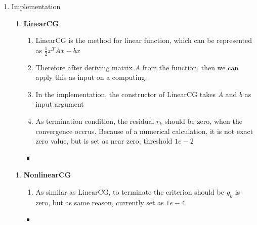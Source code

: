 \documentclass{standalone}
\begin{document}
\begin{enumerate}
  \item Implementation
  \begin{enumerate}
    \item \textbf{LinearCG}
    \begin{enumerate}
      \item LinearCG is the method for linear function, which can be represented as $\frac{1}{2}x^TAx -bx$
      \item Therefore after deriving matrix $A$ from the function, then we can apply this as input on a computing.
      \item In the implementation, the constructor of LinearCG takes $A$ and $b$ as input argument
      \item As termination condition, the residual $r_k$ should be zero, when the convergence occrus. 
      Because of a numerical calculation, it is not exact zero value, but is set as near zero, threshold $1e-2$
    \end{enumerate}
    
    \begin{itemize}[label=\quad,leftmargin=-5em]
      \item {}
    \end{itemize}
    \end{enumerate}

  \newpage \begin{enumerate}
    \item \textbf{NonlinearCG}
    \begin{enumerate}
      \item As similar as LinearCG, to terminate the criterion should be $g_k$ is zero, but as same reason, currently set as $1e-4$
    \end{enumerate}
    
    \begin{itemize}[label=\quad,leftmargin=-5em]
      \item {}
    \end{itemize}
    \end{enumerate}

  \end{enumerate}
\end{document}
